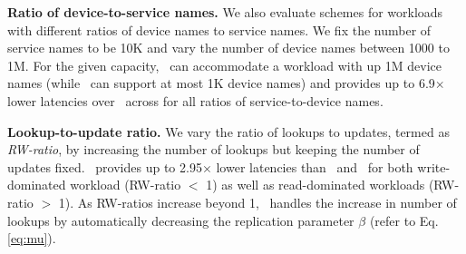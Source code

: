 {\textbf{Ratio of device-to-service names.} We also evaluate schemes for workloads with different ratios of device names to service names. We fix the number of service names to be 10K and vary the number of device names between 1000 to 1M.
For the given capacity, \auspice\  can accommodate a workload with up 1M device names (while \replicateall\ can support at most 1K device names) and provides up to 6.9$\times$ lower latencies over \staticthree\  across for all ratios of service-to-device names.


\textbf{Lookup-to-update ratio.} We vary the ratio of lookups to updates, termed as \emph{RW-ratio}, by increasing the number of lookups but keeping the number of updates fixed. \auspice\ provides up to 2.95$\times$ lower latencies than \codons\ and \staticthree\ for both write-dominated workload (RW-ratio $<$ 1) as well as read-dominated workloads (RW-ratio  $>$ 1). As RW-ratios increase beyond 1,  \auspice\ handles the increase in number of lookups  by automatically decreasing the replication parameter $\beta$ (refer to Eq. \ref{eq:mu}).

}


